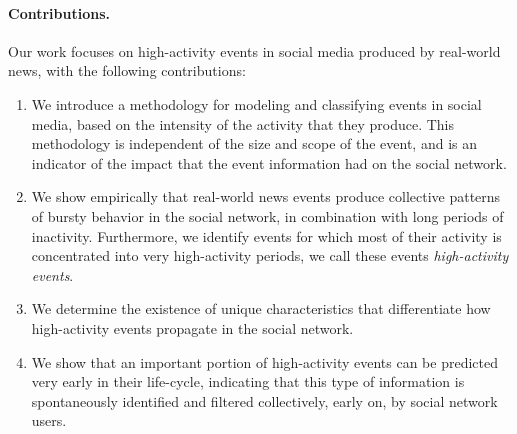 


\paragraph{Contributions.} Our work focuses on high-activity events in social
media produced by real-world news, with the following contributions:
\begin{enumerate}

\item We introduce a methodology for modeling and classifying events in social
media, based on the intensity of the activity that they produce. 
%
This methodology is independent of the size and scope of the event, and is an
indicator of the impact that the event information had on the social network.

\item We show empirically that real-world news events produce collective
patterns of bursty behavior in the social network, in combination with long periods of
inactivity. 
%
Furthermore, we identify events for which most of their activity is concentrated
into very high-activity periods, we call these events {\em high-activity
events}.

\item We determine the existence of unique characteristics that differentiate
how high-activity events propagate in the social network.

\item We show that an important portion of high-activity events can be predicted
very early in their life-cycle, indicating that this type of information is
spontaneously identified and filtered collectively, early on, by social network
users.

\end{enumerate}


